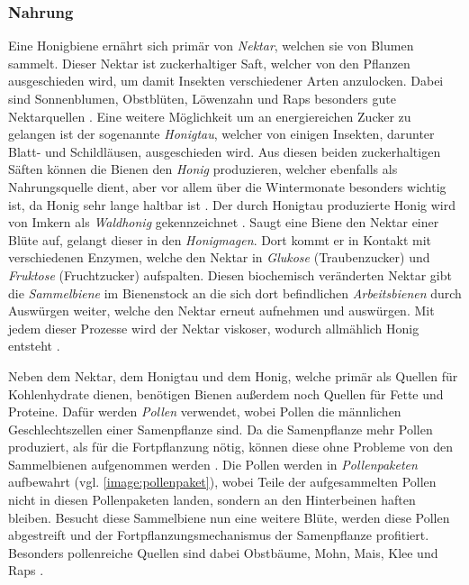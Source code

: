 \subsubsection{Nahrung}
Eine Honigbiene ernährt sich primär von \textit{Nektar}, welchen sie von Blumen sammelt. Dieser Nektar ist zuckerhaltiger Saft, welcher von den Pflanzen ausgeschieden wird, um damit Insekten verschiedener Arten anzulocken. Dabei sind Sonnenblumen, Obstblüten, Löwenzahn und Raps besonders gute Nektarquellen \cite*[]{bees:food}. Eine weitere Möglichkeit um an energiereichen Zucker zu gelangen ist der sogenannte \textit{Honigtau}, welcher von einigen Insekten, darunter Blatt- und Schildläusen, ausgeschieden wird. Aus diesen beiden zuckerhaltigen Säften können die Bienen den \textit{Honig} produzieren, welcher ebenfalls als Nahrungsquelle dient, aber vor allem über die Wintermonate besonders wichtig ist, da Honig sehr lange haltbar ist \cite*[]{bees:honeywinter}. Der durch Honigtau produzierte Honig wird von Imkern als \textit{Waldhonig} gekennzeichnet \cite*[]{bees:food}. Saugt eine Biene den Nektar einer Blüte auf, gelangt dieser in den \textit{Honigmagen}. Dort kommt er in Kontakt mit verschiedenen Enzymen, welche den Nektar in \textit{Glukose} (Traubenzucker) und \textit{Fruktose} (Fruchtzucker) \cite*[]{bees:glucosefructose} aufspalten. Diesen biochemisch veränderten Nektar gibt die \textit{Sammelbiene} im Bienenstock an die sich dort befindlichen \textit{Arbeitsbienen} durch Auswürgen weiter, welche den Nektar erneut aufnehmen und auswürgen. Mit jedem dieser Prozesse wird der Nektar viskoser, wodurch allmählich Honig entsteht \cite*[]{bees:nectartohoney}.

Neben dem Nektar, dem Honigtau und dem Honig, welche primär als Quellen für Kohlenhydrate dienen, benötigen Bienen außerdem noch Quellen für Fette und Proteine. Dafür werden \textit{Pollen} verwendet, wobei Pollen die männlichen Geschlechtszellen einer Samenpflanze sind. Da die Samenpflanze mehr Pollen produziert, als für die Fortpflanzung nötig, können diese ohne Probleme von den Sammelbienen aufgenommen werden \cite*[]{bees:honeywinter}. Die Pollen werden in \textit{Pollenpaketen} aufbewahrt (vgl. \autoref{image:pollenpaket}), wobei Teile der aufgesammelten Pollen nicht in diesen Pollenpaketen landen, sondern an den Hinterbeinen haften bleiben. Besucht diese Sammelbiene nun eine weitere Blüte, werden diese Pollen abgestreift und der Fortpflanzungsmechanismus der Samenpflanze profitiert. Besonders pollenreiche Quellen sind dabei Obstbäume, Mohn, Mais, Klee und Raps \cite*[]{bees:honeywinter}.

